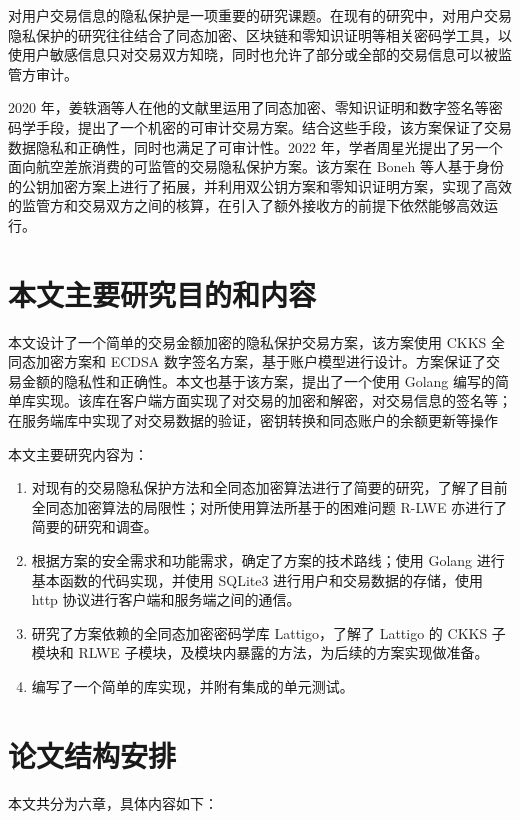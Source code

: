 对用户交易信息的隐私保护是一项重要的研究课题。在现有的研究中，对用户交易隐私保护的研究往往结合了同态加密、区块链和零知识证明等相关密码学工具，以使用户敏感信息只对交易双方知晓，同时也允许了部分或全部的交易信息可以被监管方审计。

2020 年，姜轶涵等人在他的文献里\cite{ACT}运用了同态加密、零知识证明和数字签名等密码学手段，提出了一个机密的可审计交易方案。结合这些手段，该方案保证了交易数据隐私和正确性，同时也满足了可审计性。2022 年，学者周星光提出了另一个面向航空差旅消费的可监管的交易隐私保护方案。\cite{ZXG_Air_privacy}该方案在 Boneh 等人基于身份的公钥加密方案上进行了拓展，并利用双公钥方案和零知识证明方案，实现了高效的监管方和交易双方之间的核算，在引入了额外接收方的前提下依然能够高效运行。

\section{本文主要研究目的和内容}

本文设计了一个简单的交易金额加密的隐私保护交易方案，该方案使用 CKKS 全同态加密方案\cite{cryptoeprint:2016/421}和 ECDSA 数字签名方案，基于账户模型进行设计。方案保证了交易金额的隐私性和正确性。本文也基于该方案，提出了一个使用 Golang 编写的简单库实现。该库在客户端方面实现了对交易的加密和解密，对交易信息的签名等；在服务端库中实现了对交易数据的验证，密钥转换和同态账户的余额更新等操作

本文主要研究内容为：

\begin{enumerate}
    \item 对现有的交易隐私保护方法和全同态加密算法进行了简要的研究，了解了目前全同态加密算法的局限性；对所使用算法所基于的困难问题 R-LWE 亦进行了简要的研究和调查。
    \item 根据方案的安全需求和功能需求，确定了方案的技术路线；使用 Golang 进行基本函数的代码实现，并使用 SQLite3 进行用户和交易数据的存储，使用 http 协议进行客户端和服务端之间的通信。
    \item 研究了方案依赖的全同态加密密码学库 Lattigo\cite{lattigoRepo}，了解了 Lattigo 的 CKKS 子模块和 RLWE 子模块，及模块内暴露的方法，为后续的方案实现做准备。
    \item 编写了一个简单的库实现，并附有集成的单元测试。
\end{enumerate}

\section{论文结构安排}

本文共分为六章，具体内容如下：

